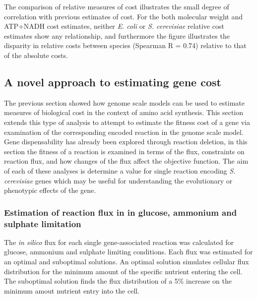 The comparison of relative measures of cost illustrates the small degree of correlation with previous estimates of cost. For the both molecular weight and ATP+NADH cost estimates, neither \emph{E. coli} or \emph{S. cerevisiae} relative cost estimates show any relationship, and furthermore the figure illustrates the disparity in relative costs between species (Spearman R = 0.74) relative to that of the absolute costs.

\subsection{A novel approach to estimating gene cost}%

The previous section showed how genome scale models can be used to estimate measures of biological cost in the context of amino acid synthesis. This section extends this type of analysis to attempt to estimate the fitness cost of a gene via examination of the corresponding encoded reaction in the genome scale model. Gene dispensability has already been explored through reaction deletion, in this section the fitness of a reaction is examined in terms of the flux, constraints on reaction flux, and how changes of the flux affect the objective function. The aim of each of these analyses is determine a value for single reaction encoding \emph{S. cerevisiae} genes which may be useful for understanding the evolutionary or phenotypic effects of the gene.

\subsubsection{Estimation of reaction flux in in glucose, ammonium and sulphate limitation}%

The \emph{in silico} flux for each single gene-associated reaction was calculated for glucose, ammonium and sulphate limiting conditions. Each flux was estimated for an optimal and suboptimal solutions. An optimal solution simulates cellular flux distribution for the minimum amount of the specific nutrient entering the cell. The suboptimal solution finds the flux distribution of a 5\% increase on the minimum amout nutrient entry into the cell.

